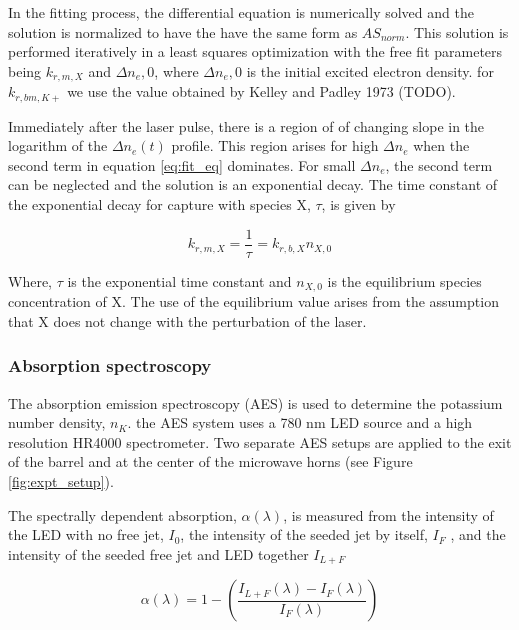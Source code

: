 In the fitting process, the differential equation is numerically solved and the solution is normalized to have the have the same form as $AS_{norm}$. This solution is performed iteratively in a least squares optimization with the free fit parameters being $k_{r,m,X}$ and $\Delta{n_e,0}$, where $\Delta{n_e,0}$ is the initial excited electron density. for $k_{r, bm, K+}$ we use the value obtained by Kelley and Padley 1973 (TODO).


Immediately after the laser pulse, there is a region of of changing slope in the logarithm of the $\Delta n_e (t)$ profile. This region arises for high $\Delta n_e$ when the second term in equation \ref{eq:fit_eq} dominates.  For small $\Delta n_e$, the second term can be neglected and the solution is an exponential decay. The time constant of the exponential decay for capture with species X, $\tau$, is given by

\begin{equation}
    k_{r, m, X} = \frac{1}{\tau} = k_{r, b, X}n_{X,0}
\end{equation}

Where, $\tau$ is the exponential time constant and $n_{X,0}$ is the equilibrium species concentration of X. The use of the equilibrium value arises from the assumption that X does not change with the perturbation of the laser.

\subsubsection{Absorption spectroscopy}

The absorption emission spectroscopy (AES) is used to determine the potassium number density, $n_K$. the AES system uses a 780 nm LED source and a high resolution HR4000 spectrometer. Two separate AES setups are applied to the exit of the barrel and at the center of the microwave horns (see Figure \ref{fig:expt_setup}).

The spectrally dependent absorption, $\alpha(\lambda)$, is measured from the intensity of the LED with no free jet, $I_0$, the intensity of the seeded jet by itself, $I_F$ , and the intensity of the seeded free jet and LED together $I_{L+F}$


\begin{equation}
    \alpha(\lambda) = 1 - \left(\frac{I_{L+F}(\lambda) - I_{F}(\lambda)}{I_F(\lambda)}\right)
\end{equation}


